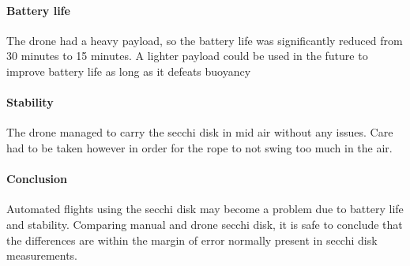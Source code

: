 \paragraph{Battery life}
The drone had a heavy payload, so the battery life was significantly reduced from 30 minutes to 15 minutes. A lighter payload could be used in the future to improve battery life as long as it defeats buoyancy

\paragraph{Stability}
The drone managed to carry the secchi disk in mid air without any issues. Care had to be taken however in order for the rope to not swing too much in the air.

\paragraph{Conclusion}
Automated flights using the secchi disk may become a problem due to battery life and stability. Comparing manual and drone secchi disk, it is safe to conclude that the differences are within the margin of error normally present in secchi disk measurements.